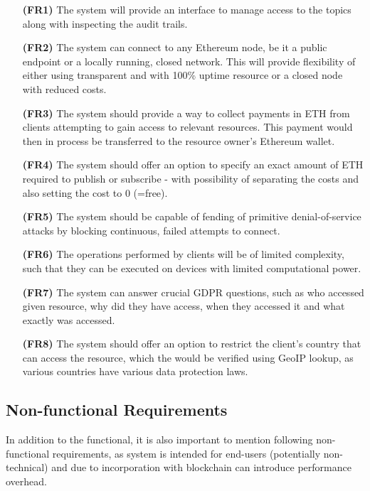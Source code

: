 \begin{itemize}[leftmargin=4.5em]
\item[\textbf{(FR1)}] The system will provide an interface to manage access to the topics along with inspecting the audit trails.
\item[\textbf{(FR2)}] The system can connect to any Ethereum node, be it a public endpoint or a locally running, closed network. This will provide flexibility of either using transparent and with 100\% uptime resource or a closed node with reduced costs.
\item[\textbf{(FR3)}] The system should provide a way to collect payments in ETH from clients attempting to gain access to relevant resources. This payment would then in process be transferred to the resource owner's Ethereum wallet.
\item[\textbf{(FR4)}] The system should offer an option to specify an exact amount of ETH required to publish or subscribe - with possibility of separating the costs and also setting the cost to 0 (=free).
\item[\textbf{(FR5)}] The system should be capable of fending of primitive denial-of-service attacks by blocking continuous, failed attempts to connect.
\item[\textbf{(FR6)}] The operations performed by clients will be of limited complexity, such that they can be executed on devices with limited computational power.
\item[\textbf{(FR7)}] The system can answer crucial GDPR questions, such as who accessed given resource, why did they have access, when they accessed it and what exactly was accessed.
\item[\textbf{(FR8)}] The system should offer an option to restrict the client's country that can access the resource, which the would be verified using GeoIP lookup, as various countries have various data protection laws.
\end{itemize}

\subsection{Non-functional Requirements}

In addition to the functional, it is also important to mention following non-functional requirements, as system is intended for end-users (potentially non-technical) and due to incorporation with blockchain can introduce performance overhead.


